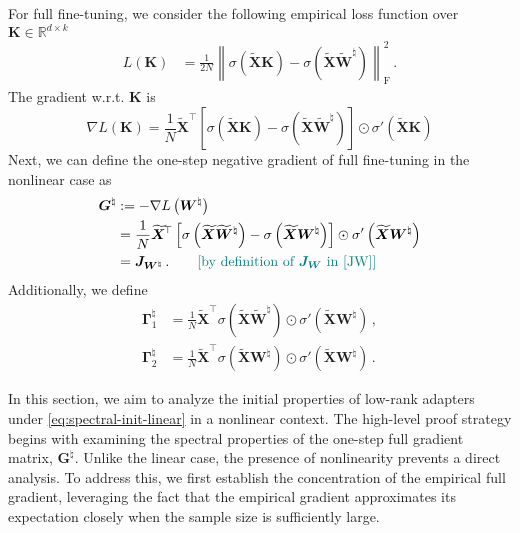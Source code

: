 For full fine-tuning, we consider the following empirical loss function over $\bm K \in \mathbb{R}^{d \times k}$
\begin{equation*}
    \begin{split}
        {L}\left(\bm K \right) & 
    = \frac{1}{2N}\left\|\sigma\left(\widetilde{\bm X}\bm K \right) - \sigma\left(\widetilde{\bm X}\widetilde{\bm W}^\natural\right)\right\|_{\mathrm{F}}^2\,.
    \end{split}
\end{equation*}
The gradient w.r.t. $\bm K$ is
\begin{equation*}
    \nabla L\left(\bm K\right) =  \frac{1}{N} \widetilde{\bm X}^{\!\top} \left[ \sigma\left(\widetilde{\bm X}\bm K \right) - \sigma\left(\widetilde{\bm X}\widetilde{\bm W}^\natural\right) \right] \odot \sigma'\left(\widetilde{\bm X}\bm K\right) 
\end{equation*}
Next, we can define the one-step negative gradient of full fine-tuning in the nonlinear case as
\begin{align*}
        \bm G^{\natural} & :=  - \nabla L\left(\bm W^{\natural}\right) \\
        & = \frac{1}{N} \widetilde{\bm X}^{\!\top} \left[ \sigma\left(\widetilde{\bm X}\widetilde{\bm W}^\natural\right)-\sigma\left(\widetilde{\bm X}\bm W^{\natural} \right)\right] \odot \sigma'\left(\widetilde{\bm X}\bm W^{\natural}\right)  \\
        & = \bm J_{\bm W^{\natural}}\,.\tag*{\color{teal}[by definition of $\bm J_{\bm W}$ in \cref{JW}]}
\end{align*}
Additionally, we define
\begin{equation}
\label{gamma-natural}
    \begin{split}
        \bm \Gamma_1^\natural & = \frac{1}{N} \widetilde{\bm X}^{\!\top} \sigma\left(\widetilde{\bm X}\widetilde{\bm W}^\natural\right)\odot \sigma'\left(\widetilde{\bm X}\bm W^{\natural}\right)\,,\\
        \bm \Gamma_2^\natural & = \frac{1}{N} \widetilde{\bm X}^{\!\top} \sigma\left(\widetilde{\bm X}\bm W^{\natural} \right) \odot \sigma'\left(\widetilde{\bm X}\bm W^{\natural}\right)\,.
    \end{split}
\end{equation}

In this section, we aim to analyze the initial properties of low-rank adapters under \eqref{eq:spectral-init-linear} in a nonlinear context. The high-level proof strategy begins with examining the spectral properties of the one-step full gradient matrix, $\bm{G}^\natural$. Unlike the linear case, the presence of nonlinearity prevents a direct analysis. To address this, we first establish the concentration of the empirical full gradient, leveraging the fact that the empirical gradient approximates its expectation closely when the sample size is sufficiently large.

